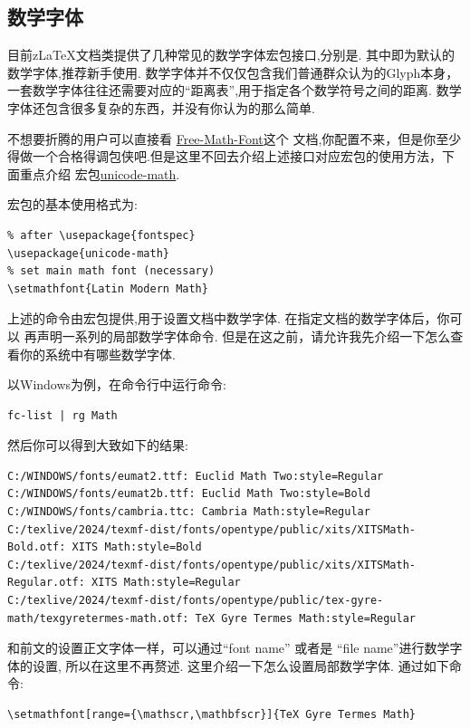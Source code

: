 \subsection{数学字体}\label{数学字体}
目前z\LaTeX{}文档类提供了几种常见的数学字体宏包接口,分别是. 
其中即为默认的数学字体,推荐新手使用. 数学字体并不仅仅包含我们普通群众认为的Glyph本身，
一套数学字体往往还需要对应的``距离表'',用于指定各个数学符号之间的距离. 数学字体还包含很多复杂的东西，并没有你认为的那么简单.

不想要折腾的用户可以直接看 \href{http://mirrors.ctan.org/info/Free_Math_Font_Survey/en/survey.pdf}{Free-Math-Font}这个 
文档,你配置不来，但是你至少得做一个合格得调包侠吧.但是这里不回去介绍上述接口对应宏包的使用方法，下面重点介绍
宏包\href{http://mirrors.ctan.org/macros/unicodetex/latex/unicode-math/unicode-math.pdf}{unicode-math}. 

宏包的基本使用格式为:
\begin{verbatim}
% after \usepackage{fontspec}
\usepackage{unicode-math}
% set main math font (necessary)
\setmathfont{Latin Modern Math}
\end{verbatim}

上述的命令\cmd{\setmathfont}\index{\cmd{\setmathfont}}由宏包提供,用于设置文档中数学字体. 在指定文档的数学字体后，你可以
再声明一系列的局部数学字体命令. 但是在这之前，请允许我先介绍一下怎么查看你的系统中有哪些数学字体. 

以Windows为例，在命令行中运行命令:
\begin{verbatim}
fc-list | rg Math
\end{verbatim}

然后你可以得到大致如下的结果:
\begin{verbatim}
C:/WINDOWS/fonts/eumat2.ttf: Euclid Math Two:style=Regular
C:/WINDOWS/fonts/eumat2b.ttf: Euclid Math Two:style=Bold
C:/WINDOWS/fonts/cambria.ttc: Cambria Math:style=Regular
C:/texlive/2024/texmf-dist/fonts/opentype/public/xits/XITSMath-Bold.otf: XITS Math:style=Bold
C:/texlive/2024/texmf-dist/fonts/opentype/public/xits/XITSMath-Regular.otf: XITS Math:style=Regular
C:/texlive/2024/texmf-dist/fonts/opentype/public/tex-gyre-math/texgyretermes-math.otf: TeX Gyre Termes Math:style=Regular
\end{verbatim}

和前文的设置正文字体一样，可以通过``font name'' 或者是 ``file name''进行数学字体的设置, 所以在这里不再赘述. 
这里介绍一下怎么设置局部数学字体. 通过如下命令:
\begin{verbatim}
\setmathfont[range={\mathscr,\mathbfscr}]{TeX Gyre Termes Math}
\end{verbatim}

